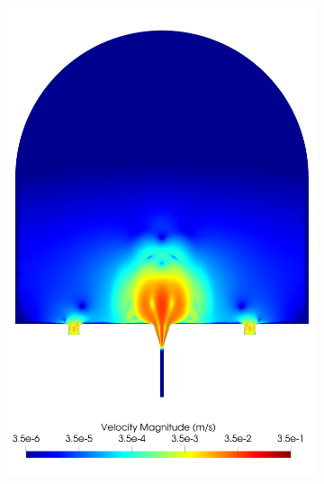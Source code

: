     \begin{figure}
        \begin{subfigure}[b]{0.45\textwidth}
            \centering
            \includegraphics[width=\textwidth]{diagrams/results-modelling/velocity-comparison/meshandsoln_dg_velocity_placentone_14_velocity-log.png}
            \caption{}
            \label{fig:4-models-placentone-norm-log:14}
        \end{subfigure}
        \hfill
        \begin{subfigure}[b]{0.45\textwidth}
            \centering

\end{subfigure}
\end{figure}
